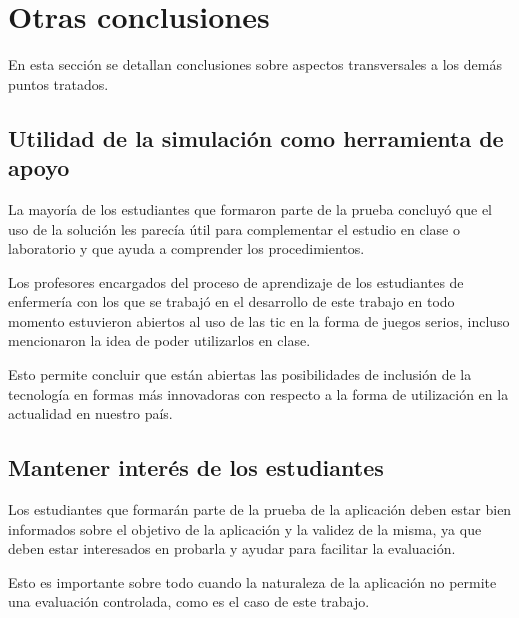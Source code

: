 \section{Otras conclusiones}

En esta sección se detallan conclusiones sobre aspectos transversales 
a los demás puntos tratados.

\subsection{Utilidad de la simulación como herramienta de apoyo}

La mayoría de los estudiantes que formaron parte de la prueba concluyó que el
uso de la solución les parecía útil para complementar el estudio en clase o
laboratorio y que ayuda a comprender los procedimientos.

Los profesores encargados del proceso de aprendizaje de los estudiantes de
enfermería con los que se trabajó en el desarrollo de este trabajo en todo
momento estuvieron abiertos al uso de las \Gls{tic} en la forma de juegos
serios, incluso mencionaron la idea de poder utilizarlos en clase. 

Esto permite concluir que están abiertas las posibilidades de inclusión de la
tecnología en formas más innovadoras con respecto a la forma de utilización en
la actualidad en nuestro país.

\subsection{Mantener interés de los estudiantes}

Los estudiantes que formarán parte de la prueba de la aplicación deben estar
bien informados sobre el objetivo de la aplicación y la validez de la misma, ya
que deben estar interesados en probarla y ayudar para facilitar la evaluación. 

Esto es importante sobre todo cuando la naturaleza de la aplicación no permite
una evaluación controlada, como es el caso de este trabajo.







